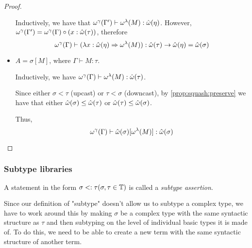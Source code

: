 \documentclass[main.tex]{subfiles}
\begin{document}
\begin{proof}
\begin{itemize}
            Inductively, we have that $\omega^{\gamma}(\Gamma') \vdash \omega^{\lambda}(M) : \hat{\omega}(\eta)$.
            However, $\omega^{\gamma}(\Gamma') = \omega^{\gamma}(\Gamma) \circ (x : \hat{\omega}(\tau))$,
            therefore \[ \omega^{\gamma}(\Gamma) \vdash (\lambda x : \hat{\omega}(\eta)
                \Rightarrow \omega^{\lambda}(M)) : \hat{\omega}(\tau) \rightarrow \hat{\omega}(\eta) = \hat{\omega}(\sigma) \]

        \item $A = \sigma[M]$, where $\Gamma \vdash M : \tau$.

            Inductively, we have $\omega^{\gamma}(\Gamma) \vdash \omega^{\lambda}(M) : \hat{\omega}(\tau)$.

            Since either $\sigma \less \tau$ (upcast) or $\tau \less \sigma$
            (downcast), by \cref{prop:squash:preserve} we have that either
            $\hat{\omega}(\sigma) \leq \hat{\omega}(\tau)$ or $\hat{\omega}(\tau) \leq \hat{\omega}(\sigma)$.

            Thus, \[
                \omega^{\gamma}(\Gamma) \vdash \hat{\omega}(\sigma)[\omega^{\lambda}(M)] : \hat{\omega}(\sigma)
            \]
    \end{itemize}
\end{proof}

\subsubsection{Subtype libraries}
\begin{defn}
    A statement in the form $\sigma <: \tau (\sigma, \tau \in \mathbb{T})$
    is called a \emph{subtype assertion}.
\end{defn}

Since our definition of "subtype" doesn't allow us to subtype a complex type,
we have to work around this by making $\sigma$ be a complex type with the same
syntactic structure as $\tau$ and then subtyping on the level of individual
basic types it is made of. To do this, we need to be able to create a new term
with the same syntactic structure of another term.

\end{document}
